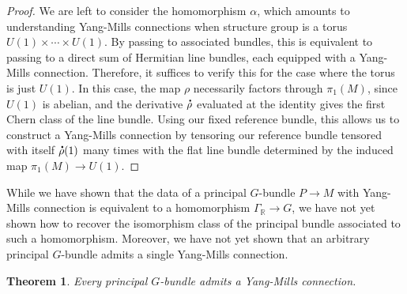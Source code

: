 \documentclass[psamsfonts, 12pt]{amsart}
\newtheorem{thm}{Theorem}[section]
\theoremstyle{definition}
\theoremstyle{remark}
\newcommand{\R}{\mathbb{R}}
\newcommand*{\dt}[1]{%
   \accentset{\mbox{\large\bfseries .}}{#1}}
\begin{document}
\begin{proof}
We are left to consider the homomorphism $\alpha$, which amounts to understanding
Yang-Mills connections when structure group is a torus $U(1) \times \cdots \times U(1)$.
By passing to associated bundles, this is equivalent to passing to a direct sum
of Hermitian line bundles, each equipped with a Yang-Mills connection. Therefore, it
suffices to verify this for the case where the torus is just $U(1)$. In this case,
the map $\rho$ necessarily factors through $\pi_1(M)$, since $U(1)$ is abelian, and
the derivative $\dt{\rho}$ evaluated at the identity gives the first Chern class
of the line bundle. Using our fixed reference bundle, this allows us to construct
a Yang-Mills connection by tensoring our reference bundle tensored with
itself $\dt{\rho}(1)$ many times with the flat line bundle determined by the induced map
$\pi_1(M) \to U(1)$.
\end{proof}
%
While we have shown that the data of a principal $G$-bundle $P \to M$ with
Yang-Mills connection is equivalent to a homomorphism $\Gamma_\R \to G$, we have
not yet shown how to recover the isomorphism class of the principal bundle associated
to such a homomorphism. Moreover, we have not yet shown that an arbitrary
principal $G$-bundle admits a single Yang-Mills connection.
%
\begin{thm}
Every principal $G$-bundle admits a Yang-Mills connection.
\end{thm}
%
\end{document}
